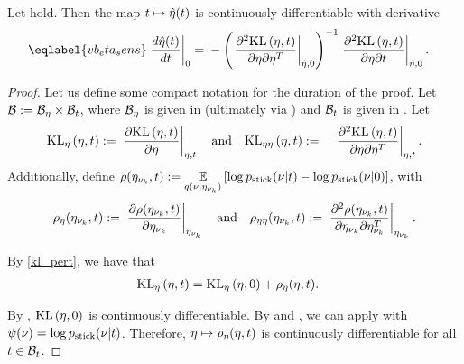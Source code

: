 \begin{thm}
%
Let  hold.  Then the map $t \mapsto
\hat\eta(t)$ is continuously differentiable with derivative
%
\begin{align}\eqlabel{vb_eta_sens}
%
\fracat{d \etaopt(\t)}{d \t}{0} ={}&
    - \left( \fracat{\partial^2 \KL{\eta, \t}}
                    {\partial \eta \partial \eta^T}
                    {\etaopt, 0} \right)^{-1}
    \fracat{\partial^2 \KL{\eta, \t}}
           {\partial \eta \partial \t}
           {\etaopt, 0}.
%
\end{align}
%
%
\begin{proof}
%
Let us define some compact notation for the duration of the proof. Let $\mathcal{B} :=
\mathcal{B}_\eta \times \mathcal{B}_t$, where $\mathcal{B}_\eta$ is given in
 (ultimately via )
and $\mathcal{B}_t$ is given in .  Let
%
\begin{align*}
%
\KLgrad{\eta, \t} :={}&
    \fracat{\partial \KL{\eta, \t}}{\partial \eta}{\eta, \t}
\mathtxt{and}
\KLhess{\eta, \t} :={}&
    \fracat{\partial^2 \KL{\eta, \t}}
           {\partial \eta \partial \eta^T}{\eta, \t}.
%
\end{align*}
%
Additionally, define $\rho(\eta_{\nu_{k}}, t) :={} \underset{q(\nu \vert \eta_{\nu_{k}})}{\mathbb{E}}\left[\log
p_{\mathrm{stick}}(\nu \vert t) - \log p_{\mathrm{stick}}(\nu \vert 0)\right]$, with
%
\begin{align*}
%
\rho_\eta(\etanuk, \t) :={}
\fracat{\partial \rho(\etanuk, \t)}
       {\partial \etanuk}{\etanuk} \mathand
\rho_{\eta\eta}(\etanuk, \t) :={}
   \fracat{\partial^2 \rho(\etanuk, \t)}
          {\partial \etanuk \partial \etanuk^T}{\etanuk}.
%
\end{align*}

By \eqref{kl_pert}, we have that
%
\begin{align*}
%
\KLgrad{\eta, \t} ={}& \KLgrad{\eta, 0} + \rho_\eta(\eta, \t).
%
\end{align*}

By , $\mathrm{KL}\left(\eta, 0\right)$ is continuously
differentiable. By  and
, we can apply
 with $\psi(\nu) = \log p_{\mathrm{stick}}(\nu \vert t)$.
Therefore, $\eta \mapsto \rho_\eta(\eta, t)$ is continuously differentiable for
all $t \in \mathcal{B}_t$.


\end{proof}
\end{thm}
